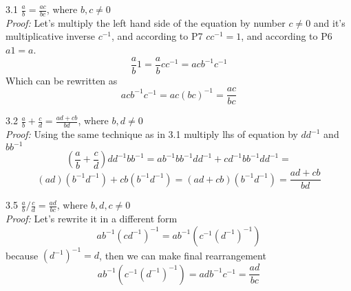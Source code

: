 \documentclass[a4paper, 11pt]{article}
\begin{document}
\hrulefill

3.1 $\frac{a}{b} = \frac{ac}{bc}$, where $b, c \ne 0$\\
\emph{Proof:}
Let's multiply the left hand side of the equation by number $c \ne 0$ and it's\\
multiplicative inverse $c^{-1}$, and according to P7 $cc^{-1} = 1$, and according to P6 $a1 = a$.
$$\frac{a}{b}1 = \frac{a}{b}cc^{-1} = acb^{-1}c^{-1}$$
Which can be rewritten as
$$acb^{-1}c^{-1} = ac(bc)^{-1} = \frac{ac}{bc}$$

\hrulefill

3.2 $\frac{a}{b} + \frac{c}{d} = \frac{ad + cb}{bd}$, where $b, d \ne 0$\\
\emph{Proof:}
Using the same technique as in 3.1 multiply lhs of equation by $dd^{-1}$ and $bb^{-1}$
$$(\frac{a}{b} + \frac{c}{d})dd^{-1}bb^{-1} = ab^{-1}bb^{-1}dd^{-1} + cd^{-1}bb^{-1}dd^{-1} = $$
$$(ad)(b^{-1}d^{-1}) + cb(b^{-1}d^{-1}) = (ad + cb)(b^{-1}d^{-1}) = \frac{ad + cb}{bd}$$


3.5 $\frac{a}{b} / \frac{c}{d} = \frac{ad}{bc}$, where $b, d, c \ne 0$\\
\emph{Proof:}
Let's rewrite it in a different form
$$ab^{-1}(cd^{-1})^{-1} = ab^{-1}(c^{-1}(d^{-1})^{-1})$$
because $(d^{-1})^{-1} = d$, then we can make final rearrangement
$$ab^{-1}(c^{-1}(d^{-1})^{-1}) = adb^{-1}c^{-1} = \frac{ad}{bc}$$
\end{document}
